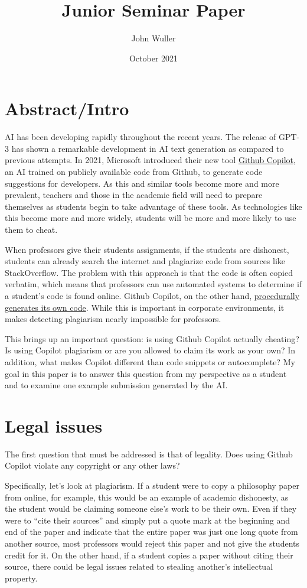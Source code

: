 \documentclass[12pt]{article}
\title{Junior Seminar Paper}
\author{John Wuller}
\date{October 2021}
\begin{document}
\hypertarget{abstractintro}{%
\section{Abstract/Intro}\label{abstractintro}}

AI has been developing rapidly throughout the recent years. The release of GPT-3
has shown a remarkable development in AI text generation as
compared to previous attempts. In 2021, Microsoft introduced their new tool
\href{https://github.blog/2021-06-29-introducing-github-copilot-ai-pair-programmer/}{Github
Copilot}, an AI trained on publicly available code from Github, to
generate code suggestions for developers. As this and similar tools
become more and more prevalent, teachers and those in the academic field
will need to prepare themselves as students begin to take advantage of
these tools. As technologies like this become more and more widely,
students will be more and more likely to use them to cheat.

When professors give their students assignments, if the students are
dishonest, students can already search the internet and plagiarize code
from sources like StackOverflow. The problem with this approach is that
the code is often copied verbatim, which means that professors can use
automated systems to determine if a student's code is found online.
Github Copilot, on the other hand,
\href{https://copilot.github.com/\#faq-does-github-copilot-recite-code-from-the-training-set}{procedurally
generates its own code}. While this is important in corporate
environments, it makes detecting plagiarism nearly impossible for
professors.

This brings up an important question: is using Github Copilot actually
cheating? Is using Copilot plagiarism or are you allowed to claim its
work as your own? In addition, what makes Copilot different than code
snippets or autocomplete? My goal in this paper is to answer this
question from my perspective as a student and to examine one example
submission generated by the AI.

\hypertarget{legal-issues}{%
\section{Legal issues}\label{legal-issues}}

The first question that must be addressed is that of legality. Does
using Github Copilot violate any copyright or any other laws?

Specifically, let's look at plagiarism. If a student were to copy a
philosophy paper from online, for example, this would be an example of
academic dishonesty, as the student would be claiming someone else's
work to be their own. Even if they were to ``cite their sources'' and
simply put a quote mark at the beginning and end of the paper and
indicate that the entire paper was just one long quote from another
source, most professors would reject this paper and not give the
students credit for it. On the other hand, if a student copies a paper
without citing their source, there could be legal issues related to
stealing another's intellectual property.
\end{document}
